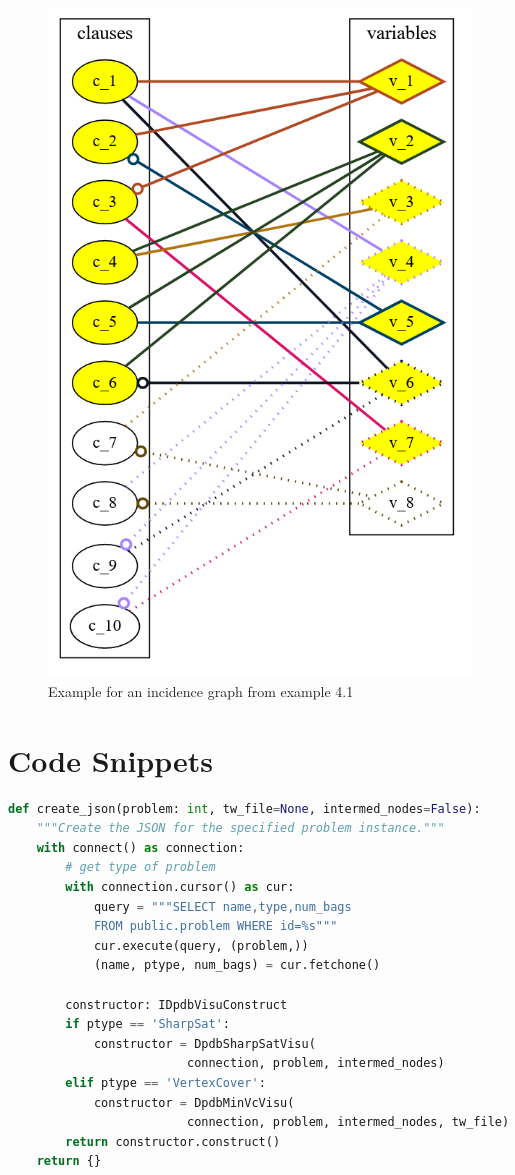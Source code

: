 \documentclass[a4paper, 12pt]{scrartcl}
\begin{document}
\begin{figure}[H]
	\centering
	\includegraphics[width=0.4\linewidth]{images/IncidenceStep6.png}
	\caption{Example for an incidence graph from example 4.1}
	\label{fig:incidencestep6}
\end{figure}
\newpage
\section{Code Snippets}




\begin{lstlisting}[language={Python}, caption={Construct\_dpdb\_visu.py}, label={lst:create-json}]
def create_json(problem: int, tw_file=None, intermed_nodes=False):
	"""Create the JSON for the specified problem instance."""
	with connect() as connection:
		# get type of problem
		with connection.cursor() as cur:
			query = """SELECT name,type,num_bags 
			FROM public.problem WHERE id=%s"""
			cur.execute(query, (problem,))
			(name, ptype, num_bags) = cur.fetchone()
		
		constructor: IDpdbVisuConstruct  
		if ptype == 'SharpSat':
			constructor = DpdbSharpSatVisu(
						 connection, problem, intermed_nodes)
		elif ptype == 'VertexCover':
			constructor = DpdbMinVcVisu(
						 connection, problem, intermed_nodes, tw_file)
		return constructor.construct()
	return {} 
\end{lstlisting}
\end{document}
